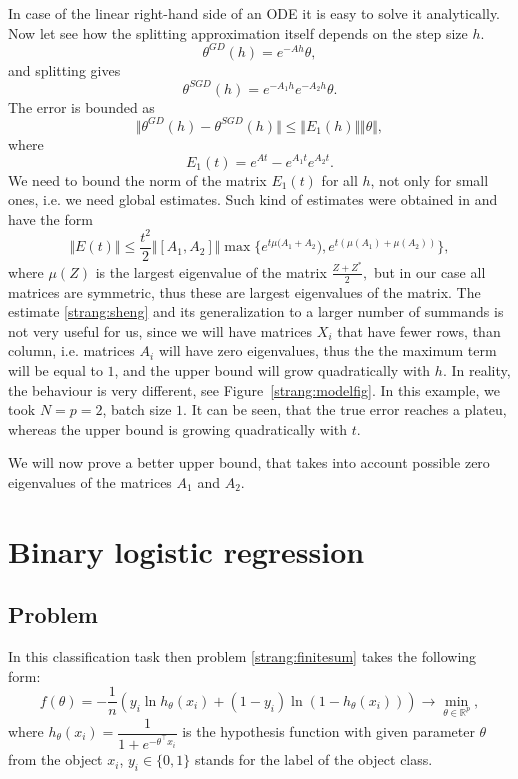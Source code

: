 \documentclass{article} %
\begin{document}
In case of the linear right-hand side of an ODE it is easy to solve it analytically. Now let see how the splitting approximation itself depends on the step size $h$.
$$\theta^{GD} (h) = e^{-Ah} \theta, $$
and splitting gives
$$\theta^{SGD}(h) = e^{-A_1 h} e^{-A_2 h} \theta.$$
The error is bounded as
$$
 \Vert \theta^{GD} (h) - \theta^{SGD}(h) \Vert \leq  \Vert E_1(h) \Vert \Vert \theta \Vert,
$$
where
\begin{equation}\label{strang:error}
E_1(t) = e^{A t} - e^{A_1 t} e^{A_2 t}.
\end{equation}
We need to bound the norm of the matrix $E_1(t)$ for all $h$, not only for small ones, i.e. we need global estimates. Such kind of estimates were obtained in \cite{sheng1994global} and have the form
\begin{equation}\label{strang:sheng}
    \Vert E(t) \Vert \leq \frac{t^2}{2} \Vert [ A_1, A_2] \Vert \max \{ e^{t \mu(A_1 + A_2}), e^{t(\mu(A_1) + \mu(A_2))}\},
\end{equation}
where $\mu(Z)$ is the largest eigenvalue of the matrix $\frac{Z+Z^*}{2},$ but in our case all matrices are symmetric, thus these are largest eigenvalues of the matrix. The estimate \eqref{strang:sheng} and its generalization to a larger number of summands is not very useful for us, since we will have matrices $X_i$ that have fewer rows, than column, i.e. matrices $A_i$ will have zero eigenvalues, thus the the maximum term will be equal to $1$, and the upper bound will grow quadratically with $h$. In reality, the behaviour is very different, see Figure~\ref{strang:modelfig}. In this example, we took $N=p=2$, batch size $1$. It can be seen, that the true error reaches a plateu, whereas the upper bound is growing quadratically with $t$.

We will now prove a better upper bound, that takes into account  possible zero eigenvalues of the matrices $A_1$ and $A_2$.

\section{Binary logistic regression}
\subsection{Problem}
In this classification task then problem \eqref{strang:finitesum} takes the following form:
\begin{equation}\label{strang:LogReg}
   f(\theta) = -\dfrac{1}{n} \left(y_i \ln h_{\theta}(x_i)  + (1-y_i) \ln (1-h_{\theta}(x_i))\right) \to \min_{\theta \in \mathbb{R}^p},
\end{equation}
where $h_\theta(x_i) = \dfrac{1}{1 + e^{-\theta^\top x_i}}$ is the hypothesis function with given parameter $\theta$ from the object $x_i$, $ y_i \in \{0,1\}$ stands for the label of the object class.
\end{document}
